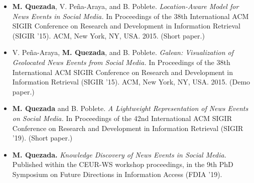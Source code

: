 \begin{itemize}
    \setlength\itemsep{1em}

    \item {\bf M. Quezada}, V. Peña-Araya, and B. Poblete. {\em Location-Aware
    Model for News Events in Social Media.} In Proceedings of the 38th
    International ACM SIGIR Conference on Research and Development in
    Information Retrieval (SIGIR '15). ACM, New York, NY, USA. 2015.
    (Short paper.)

    \item V. Peña-Araya, {\bf M. Quezada}, and B. Poblete. {\em Galean:
    Visualization of Geolocated News Events from Social Media.} In Proceedings
    of the 38th International ACM SIGIR Conference on Research and Development
    in Information Retrieval (SIGIR '15). ACM, New York, NY, USA. 2015.
    (Demo paper.)

    \item {\bf M. Quezada} and B. Poblete. {\em A Lightweight Representation of
    News Events on Social Media.} In Proceedings of the 42nd International ACM
    SIGIR Conference on Research and Development in Information Retrieval (SIGIR
    '19). (Short paper.)

    \item {\bf M. Quezada.} {\em Knowledge Discovery of News Events in Social
    Media.} Published within the CEUR-WS workshop proceedings, in the 9th
    PhD Symposium on Future Directions in Information Access (FDIA '19). 

\end{itemize}



